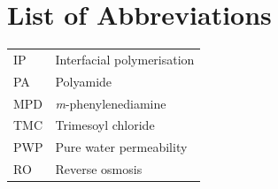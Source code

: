 \chapter*{List of Abbreviations}


\begin{tabular}{ll}
  IP   & Interfacial polymerisation \\
  PA  & Polyamide \\
  MPD  & \emph{m}-phenylenediamine \\
  TMC  & Trimesoyl chloride \\
  PWP  & Pure water permeability \\
  RO   & Reverse osmosis \\
\end{tabular}

